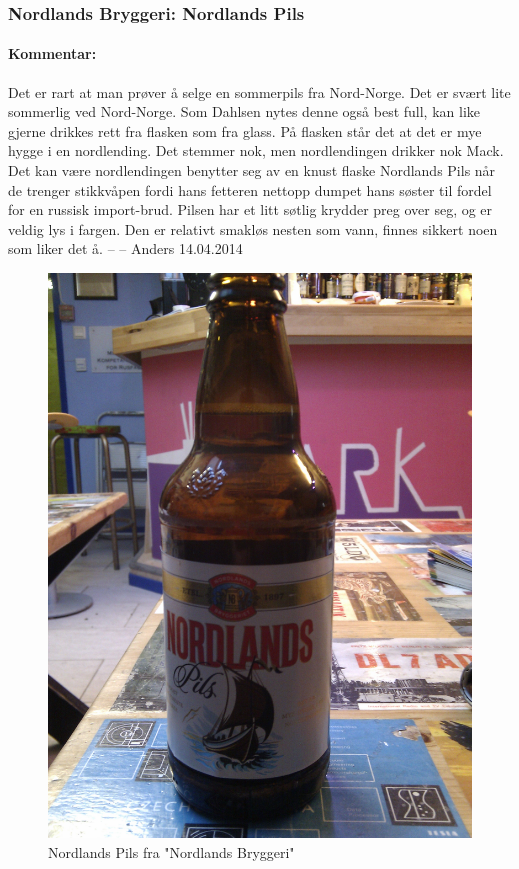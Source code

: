 \documentclass[12pt,a4paper,oneside,norsk]{article}
\begin{document}
\newpage
\subsubsection{Nordlands Bryggeri: Nordlands Pils}
\paragraph{Kommentar:}Det er rart at man prøver å selge en sommerpils fra Nord-Norge. Det er svært lite sommerlig ved Nord-Norge. Som Dahlsen nytes denne også best full, kan like gjerne drikkes rett fra flasken som fra glass. På flasken står det at det er mye hygge i en nordlending. Det stemmer nok, men nordlendingen drikker nok Mack. Det kan være nordlendingen benytter seg av en knust flaske Nordlands Pils når de trenger stikkvåpen fordi hans fetteren nettopp dumpet hans søster til fordel for en russisk import-brud. Pilsen har et litt søtlig krydder preg over seg, og er veldig lys i fargen. Den er relativt smakløs nesten som vann, finnes sikkert noen som liker det å.
\newline
-- -- Anders 14.04.2014

\begin{figure} [H]
\centering
\includegraphics[scale=0.1, angle=0]{Bilder/Ol/NordlandsPils.jpg}
\caption{Nordlands Pils fra "Nordlands Bryggeri"}
\end{figure}
\end{document}
